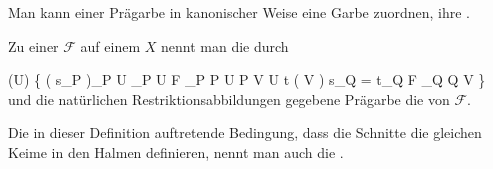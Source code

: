 \setcounter{section}{5}







Man kann einer Prägarbe in kanonischer Weise eine Garbe zuordnen, ihre  {.}


{}
{





Zu einer
${ \mathcal  F   }$ auf einem
$X$ nennt man die durch

\mavergleichskettedisphandlinks
{\vergleichskettedisphandlinks
{  (U)
}
{ } { \left\{  \left(  s_P  \right)_{P \in U} \in \prod_{P \in U} { \mathcal  F   }_P   \mid   {} P \in U  P \in V \subseteq U  t   \left(   V   \right)  s_Q = t_Q  { \mathcal  F   }_Q  Q \in V         \right\}
}
{ } {
}
{ } {
}
{ } {
}
}
{}{}{}
und die natürlichen Restriktionsabbildungen gegebene Prägarbe die
von ${ \mathcal  F   }$.





}
Die in dieser Definition auftretende Bedingung, dass die Schnitte die gleichen Keime in den Halmen definieren, nennt man auch die  {.}





